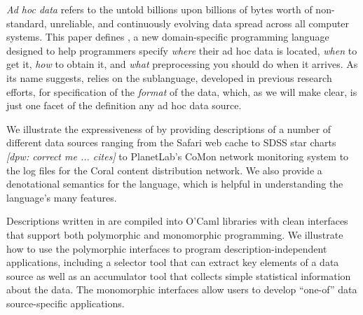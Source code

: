 {\em Ad hoc data} refers to the untold billions upon billions of bytes
worth of non-standard, unreliable, and continuously evolving data
spread across all computer systems.  This paper defines \padsd{}, a
new domain-specific programming language designed to help programmers
specify {\em where} their ad hoc data is located, {\em when} to get
it, {\em how} to obtain it, and {\em what} preprocessing you should do
when it arrives.  As its name suggests, \padsd{} relies on the \pads{}
sublanguage, developed in previous research efforts, for specification
of the {\em format} of the data, which, as we will make clear, is
just one facet of the definition any ad hoc data source.  

We illustrate the expressiveness of \padsd{} by providing descriptions
of a number of different data sources ranging from the Safari web
cache to SDSS star charts {\em [dpw: correct me ... cites]} to
PlanetLab's CoMon network monitoring system to the log files for the
Coral content distribution network.  We also provide a denotational
semantics for the language, which is helpful in understanding the
language's many features.

Descriptions written in \padsd{} are compiled into O'Caml libraries
with clean interfaces that support both polymorphic and monomorphic
programming.  We illustrate how to use the polymorphic interfaces to
program description-independent applications, including a selector
tool that can extract key elements of a data source as well as an
accumulator tool that collects simple statistical information about
the data.  The monomorphic interfaces allow users to develop
``one-of'' data source-specific applications.
